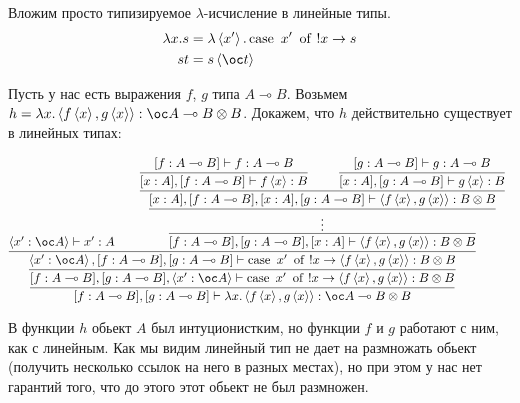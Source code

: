 Вложим просто типизируемое $\lambda$-исчисление в линейные типы.
\begin{align*}
	\lambda x.s &= \lambda\pair{x'}.\caseb{x'}{!x \rightarrow s} \\
	st          &= s\pair{\oc t}
\end{align*}
\begin{example}
	Пусть у нас есть выражения $f$, $g$  типа $A \multimap B$.
	Возьмем $h = \lambda x.\pair{f\pair{x}, g\pair{x}} : \oc A \multimap B \otimes B$.
	Докажем, что $h$ действительно существует в линейных типах:

	\[
		\infer[]{[f : A \multimap B], [g : A\multimap B]\vdash \lambda x.\pair{f\pair{x}, g\pair{x}} : \oc A \multimap B \otimes B}{
			\infer[]{
				[f : A \multimap B], [g : A \multimap B], \pair{x' : \oc A}
				\vdash \caseb{x'}{!x \rightarrow \pair{f\pair{x}, g\pair{x}} : B \otimes B}
			}{
				\infer[]{
					\pair{x' : \oc A}, [f : A \multimap B], [g : A \multimap B]
				\vdash \caseb{x'}{!x \rightarrow \pair{f\pair{x}, g\pair{x}} : B \otimes B}
				}{
					\pair{x' : \oc A} \vdash x' : A &&
					\infer[]{[f : A \multimap B], [g : A \multimap B], [x : A]\vdash \pair{f\pair{x}, g\pair{x}} : B \otimes B}{
						\infer[]{\vdots}{
						\infer[]{[x : A], [f : A \multimap B], [x : A], [g : A \multimap B]\vdash \pair{f\pair{x}, g\pair{x}} : B \otimes B}{
								\infer[]{[x : A], [f : A \multimap B]\vdash f\pair{x} : B}{[f : A \multimap B] \vdash f : A \multimap B}
								&&
								\infer[]{[x : A], [g : A \multimap B]\vdash g\pair{x} : B}{[g : A \multimap B] \vdash g : A \multimap B}
							}
						}
					}
				}
			}
		}
	\]

	В функции $h$ обьект $A$ был интуционистким, но функции $f$ и $g$ работают с ним, как с линейным.
	Как мы видим линейный тип не дает на размножать обьект (получить несколько ссылок на него в разных местах),
	но при этом у нас нет гарантий того, что до этого этот обьект не был размножен.
\end{example}

